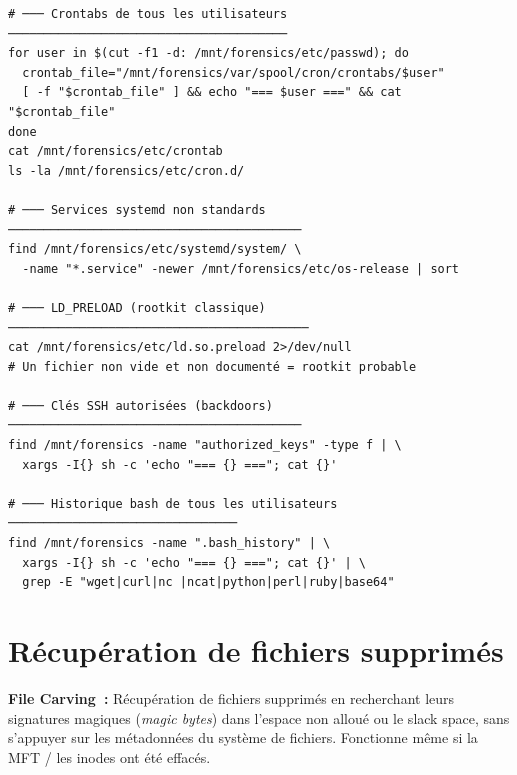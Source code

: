 \begin{lstlisting}[style=StyleTerminal,
  caption={Détection des mécanismes de persistance Linux},
  label={lst:linux-persistance}]
# ─── Crontabs de tous les utilisateurs ───────────────────────────────────────
for user in $(cut -f1 -d: /mnt/forensics/etc/passwd); do
  crontab_file="/mnt/forensics/var/spool/cron/crontabs/$user"
  [ -f "$crontab_file" ] && echo "=== $user ===" && cat "$crontab_file"
done
cat /mnt/forensics/etc/crontab
ls -la /mnt/forensics/etc/cron.d/

# ─── Services systemd non standards ─────────────────────────────────────────
find /mnt/forensics/etc/systemd/system/ \
  -name "*.service" -newer /mnt/forensics/etc/os-release | sort

# ─── LD_PRELOAD (rootkit classique) ──────────────────────────────────────────
cat /mnt/forensics/etc/ld.so.preload 2>/dev/null
# Un fichier non vide et non documenté = rootkit probable

# ─── Clés SSH autorisées (backdoors) ─────────────────────────────────────────
find /mnt/forensics -name "authorized_keys" -type f | \
  xargs -I{} sh -c 'echo "=== {} ==="; cat {}'

# ─── Historique bash de tous les utilisateurs ────────────────────────────────
find /mnt/forensics -name ".bash_history" | \
  xargs -I{} sh -c 'echo "=== {} ==="; cat {}' | \
  grep -E "wget|curl|nc |ncat|python|perl|ruby|base64"
\end{lstlisting}

\section{Récupération de fichiers supprimés}
\label{sec:carving}

\begin{boxdef}
\textbf{File Carving~:} Récupération de fichiers supprimés en recherchant
leurs signatures magiques (\textit{magic bytes}) dans l'espace non alloué
ou le slack space, sans s'appuyer sur les métadonnées du système de fichiers.
Fonctionne même si la MFT / les inodes ont été effacés.
\end{boxdef}


